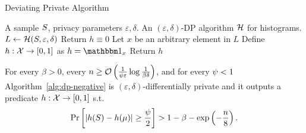 \documentclass[12pt,a4paper,oneside,onecolumn]{book}
\begin{document}
\begin{algorithm}
  \caption{Deviating Private Algorithm}
  \label{alg:dp-negative}
\begin{algorithmic}
   A sample $S$, privacy parameters $\varepsilon,\delta$. 
   An $(\varepsilon,\delta)$-DP algorithm $\mathcal{H}$ for histograms.
  \State $L \leftarrow \mathcal{H}(S,\varepsilon,\delta)$
  \State Return $h\equiv0$
  \Else
  \State Let $x$ be an arbitrary element in $L$
  \State Define $h:\mathcal{X}\to [0,1]$ as $h = \indicator{x}$
  \State Return $h$
  \EndIf
\end{algorithmic}
\end{algorithm}

\begin{lemma}
  \label{lem:negative-2}
  For every 
  $\beta>0$,
  every $n \geq \mathcal{O}\left(\frac{1}{\psi\varepsilon}\log\frac{1}{\beta\delta}\right)$,
  and for every $\psi < 1$
  Algorithm~\ref{alg:dp-negative}
  is $(\varepsilon,\delta)$-differentially private
  and it outputs a predicate $h:\mathcal{X}\to [0,1]$ s.t.
  \[
    \Pr\left[\lvert h(S) - h(\mu)\rvert \geq \frac{\psi}{2}\right]
    > 1 - \beta - \exp\left(-\frac{n}{8} \right).
  \]
\end{lemma}
\end{document}
